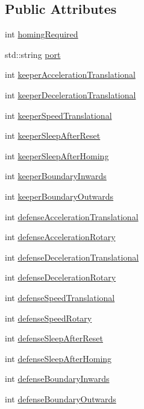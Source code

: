 \subsection*{Public Attributes}
\begin{DoxyCompactItemize}
\item 
int \hyperlink{class_motor_config_ad682f2456ab31ef096e109cecd035838}{homing\+Required}
\item 
std\+::string \hyperlink{class_motor_config_a8c20151468f9399aaa7311b421ea16da}{port}
\item 
int \hyperlink{class_motor_config_a1eb04b17920041b277c713e85d77654a}{keeper\+Acceleration\+Translational}
\item 
int \hyperlink{class_motor_config_a7150d8f715063d1f554a782386f3a2d4}{keeper\+Deceleration\+Translational}
\item 
int \hyperlink{class_motor_config_a2d71d5ba5fa077680a8e032654f3e963}{keeper\+Speed\+Translational}
\item 
int \hyperlink{class_motor_config_a997c83a3797a6c7b7f6727bbf5bb14bf}{keeper\+Sleep\+After\+Reset}
\item 
int \hyperlink{class_motor_config_acbd8a628842a29b8d2e00913ab12804d}{keeper\+Sleep\+After\+Homing}
\item 
int \hyperlink{class_motor_config_a6fd5140bdaded8a7f8f0e92b2b6a47ba}{keeper\+Boundary\+Inwards}
\item 
int \hyperlink{class_motor_config_aff93b4ab4ba55fdb1798d98e1f0cfa84}{keeper\+Boundary\+Outwards}
\item 
int \hyperlink{class_motor_config_a313a2d1c68cff0a019df7ae26b108ab5}{defense\+Acceleration\+Translational}
\item 
int \hyperlink{class_motor_config_ae45b9d75d61b3299cd705c038ddf1ebe}{defense\+Acceleration\+Rotary}
\item 
int \hyperlink{class_motor_config_a592d9fc3b1b695652f5c429b74b43b4d}{defense\+Deceleration\+Translational}
\item 
int \hyperlink{class_motor_config_a90e7d6b520e9f07addf6d190c3302a1e}{defense\+Deceleration\+Rotary}
\item 
int \hyperlink{class_motor_config_a83d498372b0f3c95ed7324c4046cbd6f}{defense\+Speed\+Translational}
\item 
int \hyperlink{class_motor_config_a23fe81b56ecce25f87aaaa8208569add}{defense\+Speed\+Rotary}
\item 
int \hyperlink{class_motor_config_a9d559c7bf6caa1b2fdc9453d36f29c59}{defense\+Sleep\+After\+Reset}
\item 
int \hyperlink{class_motor_config_a3d21777d7d29dad713a0fbf225a6e29c}{defense\+Sleep\+After\+Homing}
\item 
int \hyperlink{class_motor_config_ac5352190d05d1754cd0408240bd2c1cb}{defense\+Boundary\+Inwards}
\item 
int \hyperlink{class_motor_config_a13f55df0545d8bb3682dfae26235b5bd}{defense\+Boundary\+Outwards}
\end{DoxyCompactItemize}
